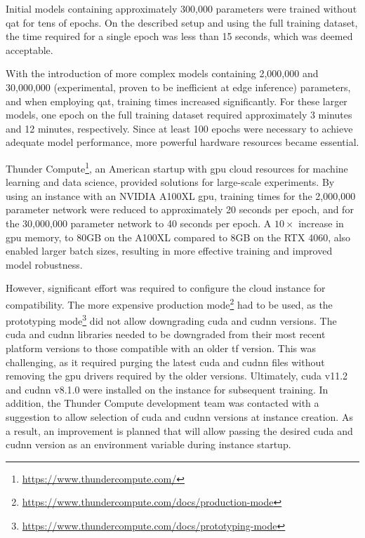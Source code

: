 {Initial models containing approximately 300,000 parameters were trained without \gls{qat} for tens of epochs.
On the described setup and using the full training dataset, the time required for a single epoch was less than 15 seconds, which was deemed acceptable.

With the introduction of more complex models containing 2,000,000 and 30,000,000 (experimental, proven to be inefficient at edge inference) parameters,
and when employing \gls{qat}, training times increased significantly.
For these larger models, one epoch on the full training dataset required approximately 3 minutes and 12 minutes, respectively.
Since at least 100 epochs were necessary to achieve adequate model performance, more powerful hardware resources became essential.

Thunder Compute\footnote{\url{https://www.thundercompute.com/}}, an American startup with \gls{gpu} cloud resources for machine learning and data science,
provided solutions for large-scale experiments.
By using an instance with an NVIDIA A100XL \gls{gpu}, training times for the 2,000,000 parameter network were reduced to approximately 20 seconds per epoch,
and for the 30,000,000 parameter network to 40 seconds per epoch.
A \ensuremath{10\times} increase in \gls{gpu} memory, to 80GB on the A100XL compared to 8GB on the RTX 4060, also enabled larger batch sizes,
resulting in more effective training and improved model robustness.

However, significant effort was required to configure the cloud instance for compatibility.
The more expensive production mode\footnote{\url{https://www.thundercompute.com/docs/production-mode}} had to be used,
as the prototyping mode\footnote{\url{https://www.thundercompute.com/docs/prototyping-mode}} did not allow downgrading \gls{cuda} and \gls{cudnn} versions.
The \gls{cuda} and \gls{cudnn} libraries needed to be downgraded from their most recent platform versions to those compatible with an older \gls{tf} version.
This was challenging, as it required purging the latest \gls{cuda} and \gls{cudnn} files without removing the \gls{gpu} drivers required by the older versions.
Ultimately, \gls{cuda} v11.2 and \gls{cudnn} v8.1.0 were installed on the instance for subsequent training.
In addition, the Thunder Compute development team was contacted with a suggestion to allow selection of \gls{cuda} and \gls{cudnn} versions at instance creation.
As a result, an improvement is planned that will allow passing the desired \gls{cuda} and \gls{cudnn} version as an environment variable during instance startup.

}
